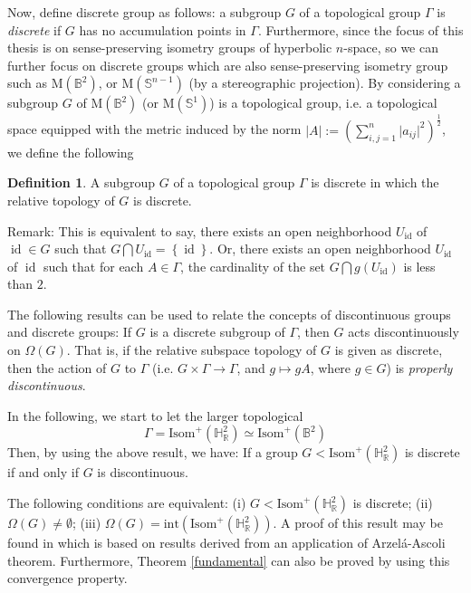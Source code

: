 \documentclass[12pt,oneside]{sfsuthesis}
\theoremstyle{plain} %
\theoremstyle{definition}  %
\newtheorem{definition}{Definition}[chapter]
\theoremstyle{remark}  %
\theoremstyle{plain}
\DeclareMathOperator{\id}{id}
\begin{document}
{Now, define discrete group as follows: a subgroup $G$ of a topological group $\Gamma$ is \textit{discrete} if $G$ has no accumulation points in $\Gamma$. Furthermore, since the focus of this thesis is on sense-preserving isometry groups of hyperbolic $n$-space, so we can further focus on discrete groups which are also sense-preserving isometry group such as $\text{M}(\mathbb{B}^2)$, or $\text{M}(\mathbb{S}^{n-1})$ (by a stereographic projection).
By considering a subgroup $G$ of $\text{M}(\mathbb{B}^2)$ (or $\text{M}(\mathbb{S}^{1})$) is a topological group, i.e. a topological space equipped with the metric induced by the norm $\left\vert A \right\vert := \left( \sum\limits_{i,j=1}^n \vert a_{ij}\vert^2 \right)^{\frac{1}{2}}$, we define the following
\begin{definition}%
A subgroup $G$ of a topological group $\Gamma$ is discrete in which the relative topology of $G$ is discrete.
\end{definition}
Remark: This is equivalent to say, there exists an open neighborhood $U_{\id}$ of $\id\in G$ such that $G\bigcap U_{\id}=\left\lbrace \id \right\rbrace$. Or, there exists an open neighborhood $U_{\id}$ of $\id$ such that for each $A\in \Gamma$, the  cardinality of the set $G\bigcap g(U_{\id})$ is less than $2$.

The following results can be used to relate the concepts of discontinuous groups and discrete groups: If $G$ is a discrete subgroup of $\Gamma$, then $G$ acts discontinuously on $\Omega(G)$. That is, if the relative subspace topology of $G$ is given as discrete, then the action of $G$ to $\Gamma$ (i.e. $G\times \Gamma\rightarrow \Gamma$, and $g\mapsto gA$, where $g\in G$) is \textit{properly discontinuous}.

In the following, we start to let the larger topological $$\Gamma=\text{Isom}^+(\mathbb{H}^2_\mathbb{R})\simeq\text{Isom}^+(\mathbb{B}^2)$$ 
Then, by using the above result, we have: If a group $G<\text{Isom}^+(\mathbb{H}^2_\mathbb{R})$ is discrete if and only if $G$ is discontinuous.%



The following conditions are equivalent: (i) $G<\text{Isom}^+(\mathbb{H}^2_\mathbb{R})$ is discrete; (ii) $\Omega(G)\neq \emptyset$; (iii) $\Omega(G)=\text{int}(\text{Isom}^+(\mathbb{H}^2_\mathbb{R}))$. A proof of this result may be found in \cite[Theorem 1.2.16]{cano2013complex} which is based on results derived from an application of Arzel\'{a}-Ascoli theorem. Furthermore, Theorem \ref{fundamental} can also be proved by using this convergence property.

}
\end{document}
